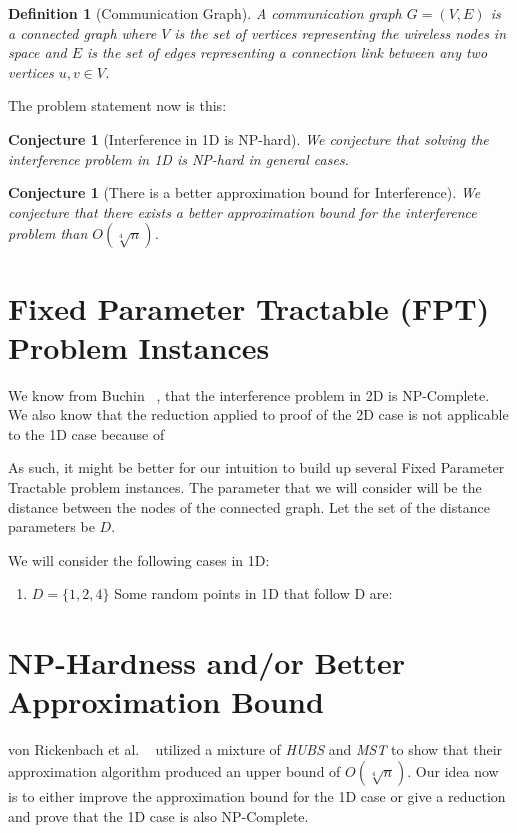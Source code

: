 \documentclass{article}
\newtheorem{conjecture}[theorem]{Conjecture}
\newtheorem{definition}[theorem]{Definition}
\begin{document}
\begin{definition}[Communication Graph]
	A communication graph $G = (V, E)$ is a connected graph where $V$ is the set of vertices representing the wireless nodes in space and $E$ is the set of edges representing a connection link between any two vertices $u, v \in V$.
\end{definition}

The problem statement now is this:

\begin{conjecture}[Interference in 1D is NP-hard]
	We conjecture that solving the interference problem in 1D is NP-hard in general cases.
\end{conjecture}

\begin{conjecture}[There is a better approximation bound for Interference]
	We conjecture that there exists a better approximation bound for the interference problem than $O(\sqrt[4]{n})$.
\end{conjecture}


\section{Fixed Parameter Tractable (FPT) Problem Instances}
We know from Buchin ~\cite{buchin2011minimizing}, that the interference problem in 2D is NP-Complete. We also know that the reduction applied to proof of the 2D case is not applicable to the 1D case because of %

As such, it might be better for our intuition to build up several Fixed Parameter Tractable problem instances. The parameter that we will consider will be the distance between the nodes of the connected graph. Let the set of the distance parameters be $D$.

We will consider the following cases in 1D:

\begin{enumerate}
	\item $D = \{1, 2, 4\}$
	      Some random points in 1D that follow D are:
	      
	      
\end{enumerate}

\section{NP-Hardness and/or Better Approximation Bound}
von Rickenbach et al. ~\cite{1420165} utilized a mixture of \textit{HUBS} and \textit{MST} to show that their approximation algorithm produced an upper bound of $O(\sqrt[4]{n})$. Our idea now is to either improve the approximation bound for the 1D case or give a reduction and prove that the 1D case is also NP-Complete.
\end{document}
